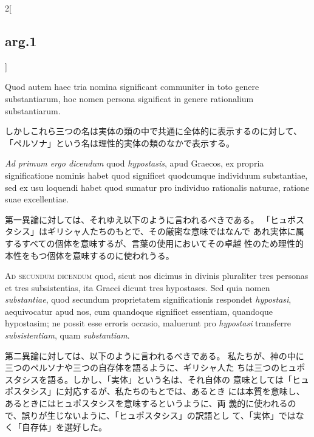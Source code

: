 \documentclass[paper=a4paper,fontsize=10pt,jafontsize=9pt,titlepage]{jlreq}
\begin{document}
\begin{paracol}{2}[\subsection{arg.1}]
\switchcolumn*

Quod autem haec tria nomina significant communiter in toto
genere substantiarum, hoc nomen persona significat in genere rationalium
substantiarum.

\switchcolumn

しかしこれら三つの名は実体の類の中で共通に全体的に表示するのに対して、
 「ペルソナ」という名は理性的実体の類のなかで表示する。

\switchcolumn*[\subsection{ad.1}]

{\itshape Ad primum ergo dicendum} quod {\itshape hypostasis}, apud Graecos, ex propria
significatione nominis habet quod significet quodcumque individuum
substantiae, sed ex usu loquendi habet quod sumatur pro individuo
rationalis naturae, ratione suae excellentiae.

\switchcolumn

第一異論に対しては、それゆえ以下のように言われるべきである。
「ヒュポスタシス」はギリシャ人たちのもとで、その厳密な意味ではなんで
 あれ実体に属するすべての個体を意味するが、言葉の使用においてその卓越
 性のため理性的本性をもつ個体を意味するのに使われうる。

\switchcolumn*[\subsection{ad.2}]

{\scshape Ad secundum dicendum} quod, sicut nos dicimus in divinis pluraliter tres
personas et tres subsistentias, ita Graeci dicunt tres hypostases. Sed
quia nomen {\itshape substantiae}, quod secundum proprietatem significationis
respondet {\itshape hypostasi}, aequivocatur apud nos, cum quandoque significet
essentiam, quandoque hypostasim; ne possit esse erroris occasio,
maluerunt pro {\itshape hypostasi} transferre {\itshape subsistentiam}, quam {\itshape substantiam}.

\switchcolumn

第二異論に対しては、以下のように言われるべきである。
私たちが、神の中に三つのペルソナや三つの自存体を語るように、ギリシャ人た
 ちは三つのヒュポスタシスを語る。しかし、「実体」という名は、それ自体の
 意味としては「ヒュポスタシス」に対応するが、私たちのもとでは、あるとき
 には本質を意味し、あるときにはヒュポスタシスを意味するというように、両
 義的に使われるので、誤りが生じないように、「ヒュポスタシス」の訳語とし
 て、「実体」ではなく「自存体」を選好した。


\end{paracol}
\end{document}
